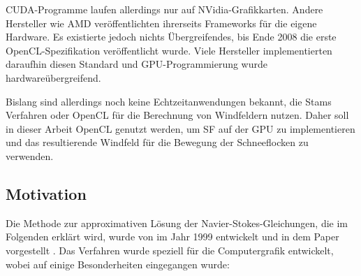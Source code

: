 CUDA-Programme laufen allerdings nur auf NVidia-Grafikkarten. Andere
Hersteller wie AMD veröffentlichten ihrerseits Frameworks für die
eigene Hardware. Es existierte jedoch nichts Übergreifendes, bis Ende
2008 die erste OpenCL-Spezifikation veröffentlicht wurde. Viele
Hersteller implementierten daraufhin diesen Standard und
GPU-Programmierung wurde hardwareübergreifend.

Bislang sind allerdings noch keine Echtzeitanwendungen bekannt, die
Stams Verfahren oder OpenCL für die Berechnung von Windfeldern
nutzen. Daher soll in dieser Arbeit OpenCL genutzt werden, um SF auf
der GPU zu implementieren und das resultierende Windfeld für die
Bewegung der Schneeflocken zu verwenden.

\subsection{Motivation}

Die Methode zur approximativen Lösung der Navier-Stokes-Gleichungen,
die im Folgenden erklärt wird, wurde von  im
Jahr 1999 entwickelt und in dem Paper 
vorgestellt \cite{Stam1999}. Das Verfahren wurde speziell für die
Computergrafik entwickelt, wobei auf einige Besonderheiten eingegangen
wurde:


